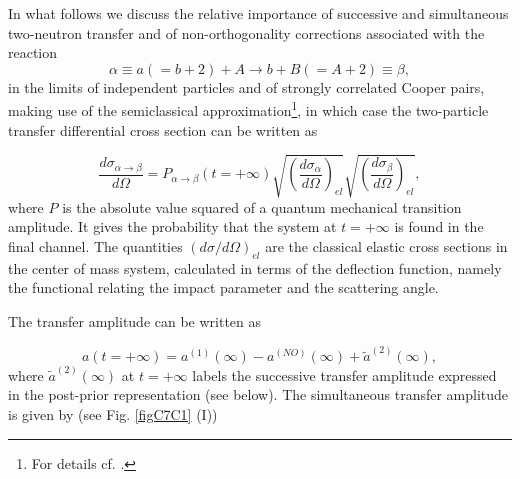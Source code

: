 In what follows we discuss the relative importance of successive and simultaneous two-neutron transfer and of non-orthogonality 
corrections associated with the reaction 
\begin{equation}
\alpha \equiv  a(=b+2) + A \to b + B(=A+2) \equiv \beta,
\label{A1}
\end{equation}
in the limits of independent particles and of strongly correlated Cooper pairs, making use  of the semiclassical approximation\footnote{For details cf. \cite{Broglia:04a}.}, in which case the two-particle transfer differential cross section can be written as

\begin{equation}
\frac{d \sigma_{\alpha \to \beta} }{d \Omega} = P_{\alpha \to \beta} (t = +\infty) 
\sqrt{ \left( \frac{d \sigma_{\alpha}}{d \Omega} \right)_{el} }
\sqrt{ \left( \frac{d \sigma_{\beta}}{d \Omega} \right)_{el}}, 
\label{A2}
\end{equation}
where $P$ is the absolute value squared of a quantum mechanical transition amplitude. It gives the probability that the system at $t = + \infty$ is found in the final channel. The quantities $(d \sigma/d\Omega)_{el}$ are the classical elastic cross sections  in the center of mass system, calculated in terms of the deflection function, namely the functional relating the impact parameter and the scattering angle. 

The transfer amplitude can be written as  


\begin{equation}
a(t = + \infty) = a^{(1)}(\infty) - a^{(NO)}(\infty) + \tilde a^{(2)} ( \infty),
\label{A3}
\end{equation}
where $\tilde a^{(2)}(\infty)$ at $t= + \infty$ 
labels  the successive transfer amplitude expressed in the post-prior representation (see below).
The simultaneous transfer amplitude is given by (see Fig. \ref{figC7C1} (I))

